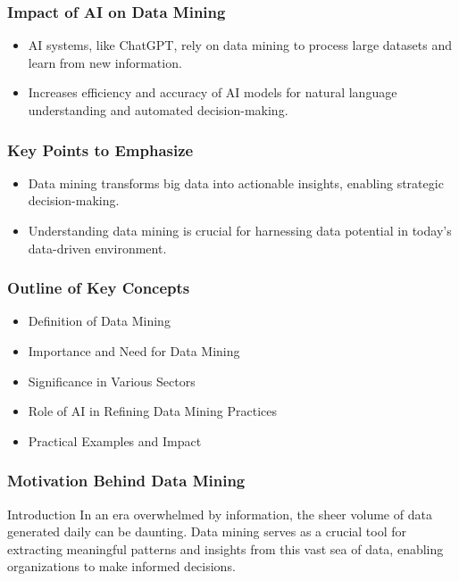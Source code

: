 \documentclass[aspectratio=169]{beamer}
\begin{document}
\begin{frame}[fragile]
    \frametitle{Impact of AI on Data Mining}
    \begin{itemize}
        \item AI systems, like ChatGPT, rely on data mining to process large datasets and learn from new information.
        \item Increases efficiency and accuracy of AI models for natural language understanding and automated decision-making.
    \end{itemize}
\end{frame}

\begin{frame}[fragile]
    \frametitle{Key Points to Emphasize}
    \begin{itemize}
        \item Data mining transforms big data into actionable insights, enabling strategic decision-making.
        \item Understanding data mining is crucial for harnessing data potential in today's data-driven environment.
    \end{itemize}
\end{frame}

\begin{frame}[fragile]
    \frametitle{Outline of Key Concepts}
    \begin{itemize}
        \item Definition of Data Mining
        \item Importance and Need for Data Mining
        \item Significance in Various Sectors
        \item Role of AI in Refining Data Mining Practices
        \item Practical Examples and Impact
    \end{itemize}
\end{frame}

\begin{frame}[fragile]
    \frametitle{Motivation Behind Data Mining}
    \begin{block}{Introduction}
        In an era overwhelmed by information, the sheer volume of data generated daily can be daunting. Data mining serves as a crucial tool for extracting meaningful patterns and insights from this vast sea of data, enabling organizations to make informed decisions.
    \end{block}
\end{frame}
\end{document}
